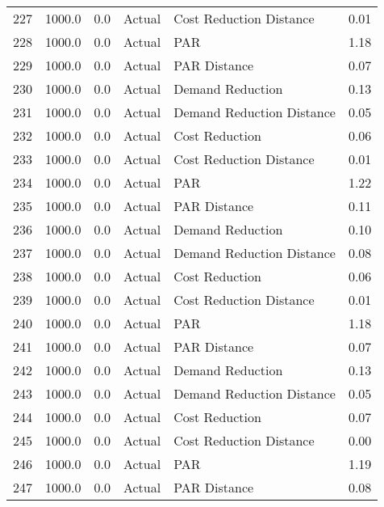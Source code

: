 \begin{longtable}{lrrllr}
227  &       1000.0 &     0.0 &         Actual &    Cost Reduction Distance &   0.01 \\
228  &       1000.0 &     0.0 &         Actual &                        PAR &   1.18 \\
229  &       1000.0 &     0.0 &         Actual &               PAR Distance &   0.07 \\
230  &       1000.0 &     0.0 &         Actual &           Demand Reduction &   0.13 \\
231  &       1000.0 &     0.0 &         Actual &  Demand Reduction Distance &   0.05 \\
232  &       1000.0 &     0.0 &         Actual &             Cost Reduction &   0.06 \\
233  &       1000.0 &     0.0 &         Actual &    Cost Reduction Distance &   0.01 \\
234  &       1000.0 &     0.0 &         Actual &                        PAR &   1.22 \\
235  &       1000.0 &     0.0 &         Actual &               PAR Distance &   0.11 \\
236  &       1000.0 &     0.0 &         Actual &           Demand Reduction &   0.10 \\
237  &       1000.0 &     0.0 &         Actual &  Demand Reduction Distance &   0.08 \\
238  &       1000.0 &     0.0 &         Actual &             Cost Reduction &   0.06 \\
239  &       1000.0 &     0.0 &         Actual &    Cost Reduction Distance &   0.01 \\
240  &       1000.0 &     0.0 &         Actual &                        PAR &   1.18 \\
241  &       1000.0 &     0.0 &         Actual &               PAR Distance &   0.07 \\
242  &       1000.0 &     0.0 &         Actual &           Demand Reduction &   0.13 \\
243  &       1000.0 &     0.0 &         Actual &  Demand Reduction Distance &   0.05 \\
244  &       1000.0 &     0.0 &         Actual &             Cost Reduction &   0.07 \\
245  &       1000.0 &     0.0 &         Actual &    Cost Reduction Distance &   0.00 \\
246  &       1000.0 &     0.0 &         Actual &                        PAR &   1.19 \\
247  &       1000.0 &     0.0 &         Actual &               PAR Distance &   0.08 \\

\end{longtable}
